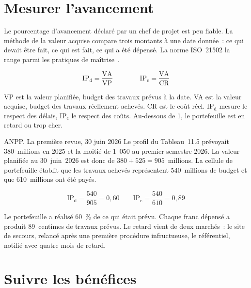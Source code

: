 \section{Mesurer l'avancement}
\label{sec:c13-avancement}

Le pourcentage d'avancement déclaré par un chef de projet est peu fiable. La méthode de la valeur acquise
compare trois montants à une date donnée~: ce qui devait être fait, ce qui est fait, ce qui a été dépensé. La
norme ISO~21502 la range parmi les pratiques de maîtrise~\cite{iso21502}.

\begin{equation}
    \mathrm{IP_d} = \frac{\mathrm{VA}}{\mathrm{VP}} \qquad\qquad \mathrm{IP_c} = \frac{\mathrm{VA}}{\mathrm{CR}}
\end{equation}

VP est la valeur planifiée, budget des travaux prévus à la date. VA est la valeur acquise, budget des travaux
réellement achevés. CR est le coût réel. $\mathrm{IP_d}$ mesure le respect des délais, $\mathrm{IP_c}$ le
respect des coûts. Au-dessous de 1, le portefeuille est en retard ou trop cher.

\begin{boxscenario}{ANPP. La première revue, 30 juin 2026}
Le profil du Tableau~11.5 prévoyait 380~millions en 2025 et la moitié de 1~050 au premier semestre 2026. La
valeur planifiée au 30~juin~2026 est donc de $380 + 525 = 905$~millions. La cellule de portefeuille établit que
les travaux achevés représentent 540~millions de budget et que 610~millions ont été payés.

\[ \mathrm{IP_d} = \frac{540}{905} = 0{,}60 \qquad \mathrm{IP_c} = \frac{540}{610} = 0{,}89 \]

Le portefeuille a réalisé 60~\% de ce qui était prévu. Chaque franc dépensé a produit 89~centimes de travaux
prévus. Le retard vient de deux marchés~: le site de secours, relancé après une première procédure
infructueuse, le référentiel, notifié avec quatre mois de retard.
\end{boxscenario}

\section{Suivre les bénéfices}
\label{sec:c13-benefices}

